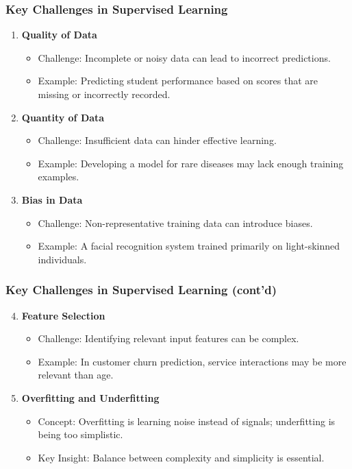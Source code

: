 \documentclass[aspectratio=169]{beamer}
\begin{document}
\begin{frame}[fragile]
    \frametitle{Key Challenges in Supervised Learning}
    
    \begin{enumerate}
        \item \textbf{Quality of Data}
        \begin{itemize}
            \item Challenge: Incomplete or noisy data can lead to incorrect predictions.
            \item Example: Predicting student performance based on scores that are missing or incorrectly recorded.
        \end{itemize}

        \item \textbf{Quantity of Data}
        \begin{itemize}
            \item Challenge: Insufficient data can hinder effective learning.
            \item Example: Developing a model for rare diseases may lack enough training examples.
        \end{itemize}

        \item \textbf{Bias in Data}
        \begin{itemize}
            \item Challenge: Non-representative training data can introduce biases.
            \item Example: A facial recognition system trained primarily on light-skinned individuals.
        \end{itemize}
    \end{enumerate}
\end{frame}

\begin{frame}[fragile]
    \frametitle{Key Challenges in Supervised Learning (cont'd)}
    
    \begin{enumerate}
        \setcounter{enumi}{3}
        \item \textbf{Feature Selection}
        \begin{itemize}
            \item Challenge: Identifying relevant input features can be complex.
            \item Example: In customer churn prediction, service interactions may be more relevant than age.
        \end{itemize}

        \item \textbf{Overfitting and Underfitting}
        \begin{itemize}
            \item Concept: Overfitting is learning noise instead of signals; underfitting is being too simplistic.
            \item Key Insight: Balance between complexity and simplicity is essential.
        \end{itemize}
    \end{enumerate}
\end{frame}
\end{document}
